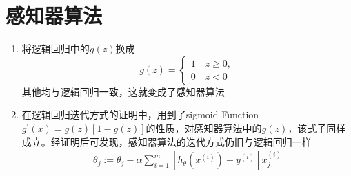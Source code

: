 \section{感知器算法}
\begin{enumerate}
	\item 将逻辑回归中的$g(z)$换成
	\[ g(z)=\begin{cases}
	1 \quad z \geq 0, \\
	0 \quad z <0
	\end{cases} \]
	其他均与逻辑回归一致，这就变成了感知器算法
	\item 在逻辑回归迭代方式的证明中，用到了sigmoid Function $g^{'}{(x)} = g(z)\left[1-g(z)\right]$的性质，对感知器算法中的$g(z)$，该式子同样成立。经证明后可发现，感知器算法的迭代方式仍旧与逻辑回归一样
	\begin{align}
		\theta_j :=  \theta_j - \alpha \sum_{i=1}^{m} \left[h_\theta(x^{(i)}) - y^{(i)} \right]x_j^{(i)}
	\end{align}
\end{enumerate}
















